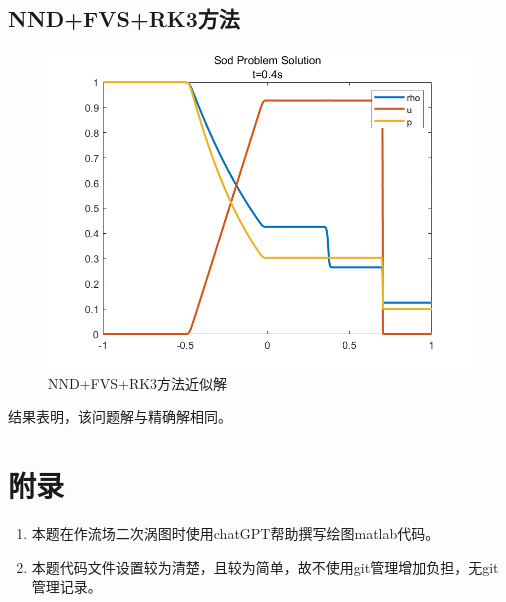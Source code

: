 \documentclass[12pt,a4paper]{article}%
\begin{document}
		\subsection{NND+FVS+RK3方法}
		\begin{figure}[H]
			\centering
			\begin{minipage}{0.83\textwidth}
				\centering
				\includegraphics[width=\textwidth]{./fig/app1.png}
				\caption{\fontsize{10pt}{15pt}\selectfont NND+FVS+RK3方法近似解}
			\end{minipage}
		\end{figure}
		结果表明，该问题解与精确解相同。	
			
	\section{附录}
		\begin{enumerate}
			\item 本题在作流场二次涡图时使用chatGPT帮助撰写绘图matlab代码。
			\item 本题代码文件设置较为清楚，且较为简单，故不使用git管理增加负担，无git管理记录。
		\end{enumerate}
	
\end{document}
